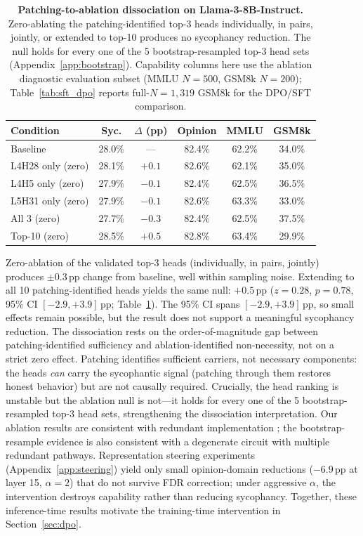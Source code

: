 \documentclass{article}
\begin{document}
\begin{table}[t]
\centering
\caption{\textbf{Patching-to-ablation dissociation on Llama-3-8B-Instruct.} Zero-ablating the patching-identified top-3 heads individually, in pairs, jointly, or extended to top-10 produces no sycophancy reduction. The null holds for every one of the 5 bootstrap-resampled top-3 head sets (Appendix~\ref{app:bootstrap}). Capability columns here use the ablation diagnostic evaluation subset (MMLU $N{=}500$, GSM8k $N{=}200$); Table~\ref{tab:sft_dpo} reports full-$N{=}1{,}319$ GSM8k for the DPO/SFT comparison.}
\label{tab:ablation}
\small
\begin{tabular}{@{}lccccc@{}}
\toprule
\textbf{Condition} & \textbf{Syc.} & \textbf{$\Delta$ (pp)} & \textbf{Opinion} & \textbf{MMLU} & \textbf{GSM8k} \\
\midrule
Baseline & 28.0\% & --- & 82.4\% & 62.2\% & 34.0\% \\
L4H28 only (zero) & 28.1\% & $+0.1$ & 82.6\% & 62.1\% & 35.0\% \\
L4H5 only (zero) & 27.9\% & $-0.1$ & 82.4\% & 62.5\% & 36.5\% \\
L5H31 only (zero) & 27.9\% & $-0.1$ & 82.6\% & 63.3\% & 33.0\% \\
All 3 (zero) & 27.7\% & $-0.3$ & 82.4\% & 62.5\% & 37.5\% \\
Top-10 (zero) & 28.5\% & $+0.5$ & 82.8\% & 63.4\% & 29.9\% \\
\bottomrule
\end{tabular}
\end{table}

Zero-ablation of the validated top-3 heads (individually, in pairs, jointly) produces $\pm 0.3$\,pp change from baseline, well within sampling noise. Extending to all 10 patching-identified heads yields the same null: $+0.5$\,pp ($z{=}0.28$, $p{=}0.78$, 95\% CI $[-2.9, +3.9]$\,pp; Table~\ref{tab:ablation}). The 95\% CI spans $[-2.9, +3.9]$\,pp, so small effects remain possible, but the result does not support a meaningful sycophancy reduction. The dissociation rests on the order-of-magnitude gap between patching-identified sufficiency and ablation-identified non-necessity, not on a strict zero effect. Patching identifies sufficient carriers, not necessary components: the heads \emph{can} carry the sycophantic signal (patching through them restores honest behavior) but are not causally required. Crucially, the head ranking is unstable but the ablation null is not---it holds for every one of the 5 bootstrap-resampled top-3 head sets, strengthening the dissociation interpretation. Our ablation results are consistent with redundant implementation \citep{mcgrath2023hydra, rushing2024explorations}; the bootstrap-resample evidence is also consistent with a degenerate circuit with multiple redundant pathways. Representation steering experiments (Appendix~\ref{app:steering}) yield only small opinion-domain reductions ($-6.9$\,pp at layer 15, $\alpha{=}2$) that do not survive FDR correction; under aggressive $\alpha$, the intervention destroys capability rather than reducing sycophancy. Together, these inference-time results motivate the training-time intervention in Section~\ref{sec:dpo}.
\end{document}
